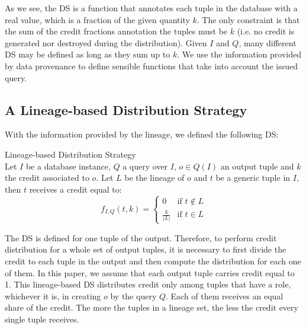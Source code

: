 As we see, the DS is a function that annotates each tuple in the database with a real value, which is a fraction of the given quantity $k$. The only constraint is that the sum of the credit fractions annotation the tuples must be $k$ (i.e. no credit is generated nor destroyed during the distribution).
Given $I$ and $Q$, many different DS may be defined as long as they sum up to $k$. We use the information provided by data provenance to define sensible functions that take into account the issued query. 

\subsection{A Lineage-based Distribution Strategy}
With the information provided by the lineage, we defined the following DS:

\begin{definition}{Lineage-based Distribution Strategy}~\citep{dosso2020data}
    \label{def:lineage_ds}\\
    Let $I$ be a database instance, $Q$ a query over $I$, $o \in Q(I)$ an output tuple and $k$ the credit associated to $o$.
    Let $L$ be the lineage of $o$ and $t$ be a generic tuple in $I$, then $t$ receives a credit equal to:
    \begin{equation*}
        f_{I, Q}(t, k) =  \begin{cases}
         0 & \mbox{if $t \notin L$} \\
            \frac{k}{|L|} & \mbox{if $t \in L$}
        \end{cases}
    \end{equation*}
\end{definition}

%

The DS is defined for one tuple of the output. Therefore, to perform credit distribution for a whole set of output tuples, it is necessary to first divide the credit to each tuple in the output and then compute the distribution for each one of them.
In this paper, we assume that each output tuple carries credit equal to 1. 
This lineage-based DS distributes credit only among tuples that have a role, whichever it is, in creating $o$ by the query $Q$. Each of them receives an equal share of the credit. The more the tuples in a lineage set, the less the credit every single tuple receives. 


